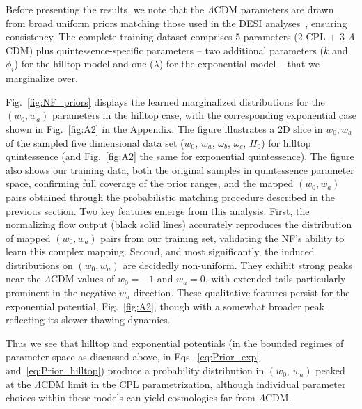 \documentclass[floats,floatfix,showpacs,amssymb,prd,twocolumn,superscriptaddress,nofootinbib,reprint,preprintnumbers]{revtex4-2}
\begin{document}
Before presenting the results, we note that the $\Lambda$CDM parameters are drawn from broad uniform priors matching those used in the DESI analyses~\cite{DESI:2025zgx,DESI:2025fii}, ensuring consistency. The complete training dataset comprises 5 parameters (2 CPL + 3 $\Lambda$CDM) plus quintessence-specific parameters -- two additional parameters ($k$ and $\phi_i$) for the hilltop model and one ($\lambda$) for the exponential model -- that we marginalize over.


Fig.~\ref{fig:NF_priors} displays the learned marginalized distributions for the  $(w_0, w_a)$ parameters in the hilltop case, with the corresponding exponential case shown in Fig.~\ref{fig:A2} in the Appendix.  The figure illustrates a 2D slice in $w_0, w_a$ of the sampled five dimensional data set ($w_0$, $w_a$, $\omega_b$, $\omega_c$, $H_0$) for hilltop quintessence (and Fig.~\ref{fig:A2} the same for exponential quintessence).   
The figure also shows our training data, both the original samples in quintessence parameter space, confirming full coverage of the prior ranges, and the mapped $(w_0, w_a)$ pairs obtained through the probabilistic matching procedure described in the previous section. Two key features emerge from this analysis. First, the normalizing flow output (black solid lines) accurately reproduces the distribution of mapped $(w_0, w_a)$ pairs from our training set, validating the NF's ability to learn this complex mapping. Second, and most significantly, the induced distributions on $(w_0, w_a)$ are decidedly non-uniform. They exhibit strong peaks near the $\Lambda$CDM values of $w_0= -1$ and $w_a = 0$, with extended tails particularly prominent in the negative $w_a$ direction. These qualitative features persist for the exponential potential, Fig.~\ref{fig:A2}, though with a somewhat broader peak reflecting its slower thawing dynamics. 

Thus we see that hilltop and exponential potentials (in the bounded regimes of parameter space as discussed above, in Eqs.~\eqref{eq:Prior_exp} and~\eqref{eq:Prior_hilltop}) produce a probability distribution in $(w_0,\, w_a)$ peaked at the $\Lambda$CDM limit in the CPL parametrization, although individual parameter choices within these models can yield cosmologies far from $\Lambda$CDM.
\end{document}
